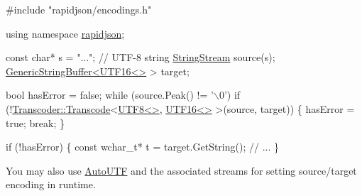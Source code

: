 \begin{DoxyCode}
\textcolor{preprocessor}{#include "rapidjson/encodings.h"}

\textcolor{keyword}{using namespace }\hyperlink{namespacerapidjson}{rapidjson};

\textcolor{keyword}{const} \textcolor{keywordtype}{char}* s = \textcolor{stringliteral}{"..."}; \textcolor{comment}{// UTF-8 string}
\hyperlink{struct_generic_string_stream}{StringStream} source(s);
\hyperlink{class_generic_string_buffer}{GenericStringBuffer<UTF16<>} > target;

\textcolor{keywordtype}{bool} hasError = \textcolor{keyword}{false};
\textcolor{keywordflow}{while} (source.Peak() != \textcolor{charliteral}{'\(\backslash\)0'})
    \textcolor{keywordflow}{if} (!\hyperlink{struct_transcoder_a0ea2edfe35784ebf1063921d2bd5fb66}{Transcoder::Transcode}<\hyperlink{struct_u_t_f8}{UTF8<>}, \hyperlink{struct_u_t_f16}{UTF16<>} >(source, target)) \{
        hasError = \textcolor{keyword}{true};
        \textcolor{keywordflow}{break};
    \}

\textcolor{keywordflow}{if} (!hasError) \{
    \textcolor{keyword}{const} \textcolor{keywordtype}{wchar\_t}* t = target.GetString();
    \textcolor{comment}{// ...}
\}
\end{DoxyCode}


You may also use {\ttfamily \hyperlink{struct_auto_u_t_f}{Auto\+U\+TF}} and the associated streams for setting source/target encoding in runtime. 